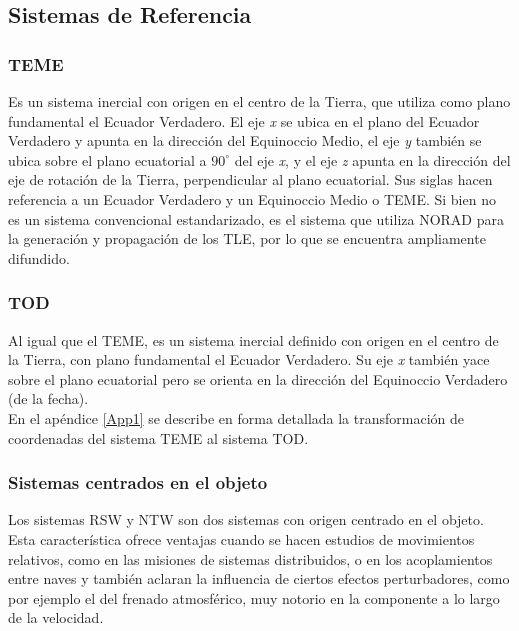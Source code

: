 {\subsection{Sistemas de Referencia}\label{subsec:sistRef}

\subsubsection*{\ac{TEME}}
 Es un sistema inercial con origen en el centro de la Tierra, que utiliza como plano fundamental el Ecuador Verdadero. El eje {\it{x}} se ubica en el plano del Ecuador Verdadero y apunta en la direcci\'on del Equinoccio Medio, el eje {\it{y}} tambi\'en se ubica sobre el plano ecuatorial a $90^{\circ}$ del eje {\it{x}}, y el eje {\it{z}} apunta en la direcci\'on del eje de rotaci\'on de la Tierra, perpendicular al plano ecuatorial. Sus siglas hacen referencia a un Ecuador Verdadero y un Equinoccio Medio o \ac{TEME}. Si bien no es un sistema convencional estandarizado, es el sistema que utiliza NORAD para la generaci\'on y propagaci\'on de los TLE, por lo que se encuentra ampliamente difundido.
 
\subsubsection*{\ac{TOD}}
 Al igual que el TEME, es un sistema inercial definido con origen en el centro de la Tierra, con plano fundamental el Ecuador Verdadero. Su eje {\it{x}} tambi\'en yace sobre el plano ecuatorial pero se orienta en la direcci\'on del Equinoccio Verdadero (de la fecha).\\
 En el ap\'endice \ref{App1} se describe en forma detallada la transformaci\'on de coordenadas del sistema TEME al sistema TOD.
 
\subsubsection*{Sistemas centrados en el objeto}
Los sistemas \ac{RSW} y \ac{NTW} son dos sistemas con origen centrado en el objeto. Esta caracter\'istica ofrece ventajas cuando se hacen estudios de movimientos relativos, como en las misiones de sistemas distribuidos, o en los acoplamientos entre naves y tambi\'en aclaran la influencia de ciertos efectos perturbadores, como por ejemplo el del frenado atmosf\'erico, muy notorio en la componente a lo largo de la velocidad.\\

}
